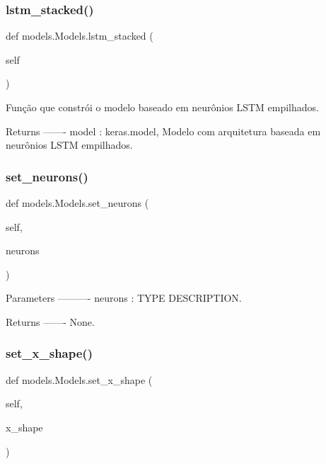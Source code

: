 \subsubsection{\texorpdfstring{lstm\+\_\+stacked()}{lstm\_stacked()}}
{\footnotesize\ttfamily def models.\+Models.\+lstm\+\_\+stacked (\begin{DoxyParamCaption}\item[{}]{self }\end{DoxyParamCaption})}

\begin{DoxyVerb}Função que constrói o modelo baseado em neurônios LSTM empilhados.

Returns
-------
model : keras.model,
    Modelo com arquitetura baseada em neurônios LSTM empilhados.\end{DoxyVerb}
 \mbox{\label{classmodels_1_1Models_a188d50d7b64d7ab545be9a434e6e7c19}} 
\subsubsection{\texorpdfstring{set\+\_\+neurons()}{set\_neurons()}}
{\footnotesize\ttfamily def models.\+Models.\+set\+\_\+neurons (\begin{DoxyParamCaption}\item[{}]{self,  }\item[{}]{neurons }\end{DoxyParamCaption})}

\begin{DoxyVerb}Parameters
----------
neurons : TYPE
    DESCRIPTION.

Returns
-------
None.\end{DoxyVerb}
 \mbox{\label{classmodels_1_1Models_a8f0f9abd97b5a4fb6453a05baff20d14}} 
\subsubsection{\texorpdfstring{set\+\_\+x\+\_\+shape()}{set\_x\_shape()}}
{\footnotesize\ttfamily def models.\+Models.\+set\+\_\+x\+\_\+shape (\begin{DoxyParamCaption}\item[{}]{self,  }\item[{}]{x\+\_\+shape }\end{DoxyParamCaption})}

